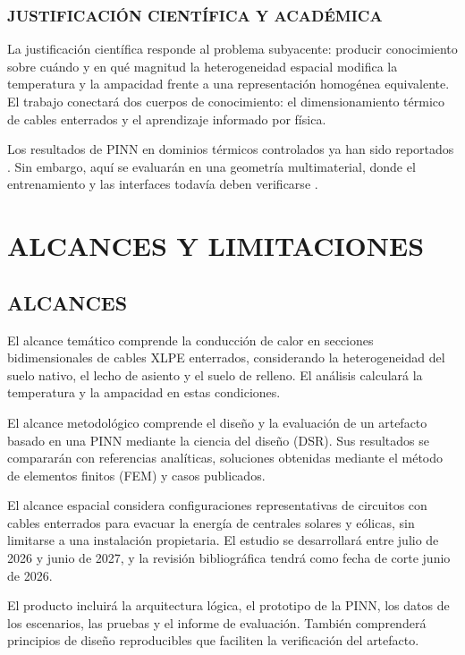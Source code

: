 \documentclass[11pt,a4paper,oneside]{report}
\begin{document}
\subsubsection{JUSTIFICACIÓN CIENTÍFICA Y ACADÉMICA}

La justificación científica responde al problema subyacente: producir conocimiento sobre cuándo y en qué magnitud la heterogeneidad espacial modifica la temperatura y la ampacidad frente a una representación homogénea equivalente. El trabajo conectará dos cuerpos de conocimiento: el dimensionamiento térmico de cables enterrados y el aprendizaje informado por física.

Los resultados de PINN en dominios térmicos controlados ya han sido reportados \parencites[1--3,17]{xing2023}[1,3,16]{pan2025}. Sin embargo, aquí se evaluarán en una geometría multimaterial, donde el entrenamiento y las interfaces todavía deben verificarse \parencite[2--6]{ren2025}.

\section{ALCANCES Y LIMITACIONES}

\subsection{ALCANCES}

El alcance temático comprende la conducción de calor en secciones bidimensionales de cables XLPE enterrados, considerando la heterogeneidad del suelo nativo, el lecho de asiento y el suelo de relleno. El análisis calculará la temperatura y la ampacidad en estas condiciones.

El alcance metodológico comprende el diseño y la evaluación de un artefacto basado en una PINN mediante la ciencia del diseño (DSR). Sus resultados se compararán con referencias analíticas, soluciones obtenidas mediante el método de elementos finitos (FEM) y casos publicados.

El alcance espacial considera configuraciones representativas de circuitos con cables enterrados para evacuar la energía de centrales solares y eólicas, sin limitarse a una instalación propietaria. El estudio se desarrollará entre julio de 2026 y junio de 2027, y la revisión bibliográfica tendrá como fecha de corte junio de 2026.

El producto incluirá la arquitectura lógica, el prototipo de la PINN, los datos de los escenarios, las pruebas y el informe de evaluación. También comprenderá principios de diseño reproducibles que faciliten la verificación del artefacto.
\end{document}
